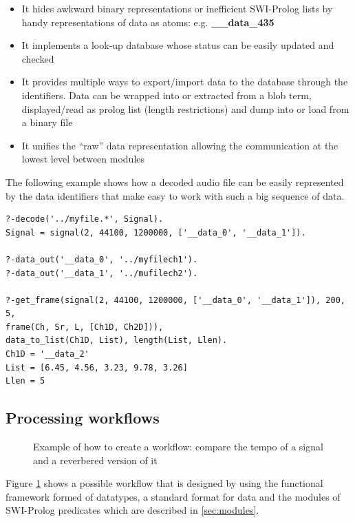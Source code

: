 \documentclass[runningheads]{llncs}
\begin{document}
\begin{itemize}
 \item It hides awkward binary representations or inefficient SWI-Prolog lists by handy representations of data as atoms: e.g. \textbf{\_\_data\_435}
 \item It implements a look-up database whose status can be easily updated and checked
 \item It provides multiple ways to export/import data to the database through the identifiers. Data can be wrapped into or extracted from a blob term, displayed/read as prolog list (length restrictions) and dump into or load from a binary file
 \item It unifies the ``raw'' data representation allowing the communication at the lowest level between modules 
\end{itemize}

The following example shows how a decoded audio file can be easily represented by the data identifiers that make easy to work with such a big sequence of data.
\begin{verbatim}
?-decode('../myfile.*', Signal).
Signal = signal(2, 44100, 1200000, ['__data_0', '__data_1']).

?-data_out('__data_0', '../myfilech1').
?-data_out('__data_1', '../mufilech2').

?-get_frame(signal(2, 44100, 1200000, ['__data_0', '__data_1']), 200, 5,
frame(Ch, Sr, L, [Ch1D, Ch2D])),
data_to_list(Ch1D, List), length(List, Llen).
Ch1D = '__data_2'
List = [6.45, 4.56, 3.23, 9.78, 3.26]
Llen = 5
\end{verbatim}

\subsection{Processing workflows}\label{subsec:worflow}

\begin{figure}
\centerline{}
\caption{Example of how to create a workflow: compare the tempo of a signal and a reverbered version of it}
\label{fig:workflow}
\end{figure}

Figure \ref{fig:workflow} shows a possible workflow that is designed by using the functional framework formed of datatypes, a standard format for data and the modules of SWI-Prolog predicates which are described in \ref{sec:modules}.
\end{document}
